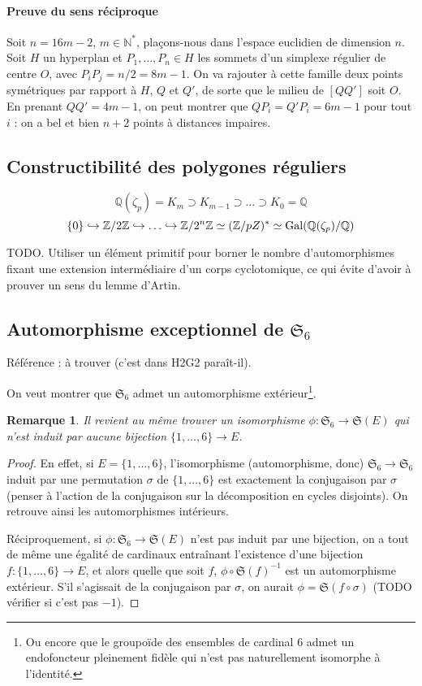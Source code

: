 \documentclass[a4paper, 11pt]{article}
\def\Z{\mathbb{Z}}
\def\N{\mathbb{N}}
\def\Q{\mathbb{Q}}
\def\Sigmap{\mathfrak{S}}
\newtheorem*{remark}{Remarque}
\begin{document}
\paragraph{Preuve du sens réciproque}

Soit $n = 16m - 2$, $m \in \N^*$, plaçons-nous dans l'espace euclidien de
dimension $n$. Soit $H$ un hyperplan et $P_1, \ldots, P_n \in H$ les sommets
d'un simplexe régulier de centre $O$, avec $P_iP_j = n/2 = 8m-1$. On va rajouter
à cette famille deux points symétriques par rapport à $H$, $Q$ et $Q'$, de sorte
que le milieu de $[QQ']$ soit $O$. En prenant $QQ' = 4m - 1$, on peut montrer
que $QP_i = Q'P_i = 6m - 1$ pour tout $i$ : on a bel et bien $n+2$ points à
distances impaires.


\subsection{Constructibilité des polygones réguliers}

\[ \Q(\zeta_p) = K_m \supset K_{m-1} \supset \ldots \supset K_0 = \Q \]
\[ \{0\} \hookrightarrow \Z/2\Z \hookrightarrow \ldots \hookrightarrow \Z/2^n\Z
  \simeq (\Z/pZ)^* \simeq \textnormal{Gal}(\Q(\zeta_p)/\Q) \]

TODO. Utiliser un élément primitif pour borner le nombre d'automorphismes fixant
une extension intermédiaire d'un corps cyclotomique, ce qui évite d'avoir à
prouver un sens du lemme d'Artin.

\subsection{Automorphisme exceptionnel de $\Sigmap_6$}

Référence : à trouver (c'est dans H2G2 paraît-il).

On veut montrer que $\Sigmap_6$ admet un automorphisme extérieur\footnote{Ou
  encore que le groupoïde des ensembles de cardinal 6 admet un endofoncteur
  pleinement fidèle qui n'est pas naturellement isomorphe à l'identité.}.

\begin{remark}
  Il revient au même trouver un isomorphisme $\phi : \Sigmap_6 \to \Sigmap(E)$
  qui n'est induit par aucune bijection $\{1,\ldots,6\} \to E$.
\end{remark}
\begin{proof}
  En effet, si $E = \{1,\ldots,6\}$, l'isomorphisme (automorphisme, donc)
  $\Sigmap_6 \to \Sigmap_6$ induit par une permutation $\sigma$ de
  $\{1,\ldots,6\}$ est exactement la conjugaison par $\sigma$ (penser à l'action
  de la conjugaison sur la décomposition en cycles disjoints). On retrouve ainsi
  les automorphismes intérieurs.

  Réciproquement, si $\phi : \Sigmap_6 \to \Sigmap(E)$ n'est pas induit par une
  bijection, on a tout de même une égalité de cardinaux entraînant l'existence
  d'une bijection $f : \{1,\ldots,6\} \to E$, et alors quelle que soit $f$,
  $\phi \circ \Sigmap(f)^{-1}$ est un automorphisme extérieur. S'il s'agissait
  de la conjugaison par $\sigma$, on aurait $\phi = \Sigmap(f \circ \sigma)$
  (TODO vérifier si c'est pas $-1$).
\end{proof}
\end{document}
